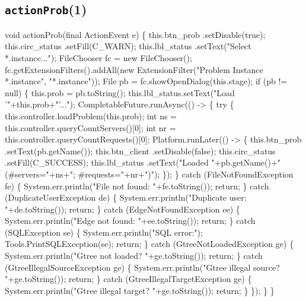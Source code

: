 \subsection{\texttt{actionProb}(1)}
\nwenddocs{}\endmoddef{}
void actionProb(final ActionEvent e) \{
  this.btn_prob     .setDisable(true);
  this.circ_status  .setFill(C_WARN);
  this.lbl_status   .setText("Select *.instance...");
  FileChooser fc = new FileChooser();
  fc.getExtensionFilters().addAll(new ExtensionFilter("Problem Instance *.instance", "*.instance"));
  File pb = fc.showOpenDialog(this.stage);
  if (pb != null) \{
    this.prob = pb.toString();
    this.lbl_status.setText("Load '"+this.prob+"'...");
    CompletableFuture.runAsync(() -> \{
      try \{
        this.controller.loadProblem(this.prob);
        int ns = this.controller.queryCountServers()[0];
        int nr = this.controller.queryCountRequests()[0];
        Platform.runLater(() -> \{
          this.btn_prob     .setText(pb.getName());
          this.btn_client   .setDisable(false);
          this.circ_status  .setFill(C_SUCCESS);
          this.lbl_status   .setText("Loaded "+pb.getName()+"(#servers="+ns+"; #requests="+nr+")");
        \});
      \} catch (FileNotFoundException fe) \{
        System.err.println("File not found: "+fe.toString());
        return;
      \} catch (DuplicateUserException de) \{
        System.err.println("Duplicate user: "+de.toString());
        return;
      \} catch (EdgeNotFoundException ee) \{
        System.err.println("Edge not found: "+ee.toString());
        return;
      \} catch (SQLException se) \{
        System.err.println("SQL error:");
        Tools.PrintSQLException(se);
        return;
      \} catch (GtreeNotLoadedException ge) \{
        System.err.println("Gtree not loaded? "+ge.toString());
        return;
      \} catch (GtreeIllegalSourceException ge) \{
        System.err.println("Gtree illegal source? "+ge.toString());
        return;
      \} catch (GtreeIllegalTargetException ge) \{
        System.err.println("Gtree illegal target? "+ge.toString());
        return;
      \}
    \});
  \}
\}
\nwendcode{}\nwdocspar

